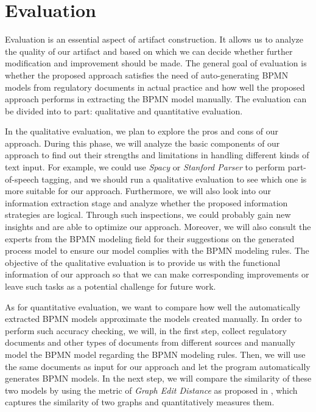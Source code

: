\chapter{Evaluation}

Evaluation is an essential aspect of artifact construction. It allows us to analyze the quality of our artifact and based on which we can decide whether further modification and improvement should be made. The general goal of evaluation is whether the proposed approach satisfies the need of auto-generating BPMN models from regulatory documents in actual practice and how well the proposed approach performs in extracting the BPMN model manually. The evaluation can be divided into to part: qualitative and quantitative evaluation. 

In the qualitative evaluation, we plan to explore the pros and cons of our approach. During this phase, we will analyze the basic components of our approach to find out their strengths and limitations in handling different kinds of text input. For example, we could use \textit{Spacy} or \textit{Stanford Parser} to perform part-of-speech tagging, and we should run a qualitative evaluation to see which one is more suitable for our approach. Furthermore, we will also look into our information extraction stage and analyze whether the proposed information strategies are logical. Through such inspections, we could probably gain new insights and are able to optimize our approach. Moreover, we will also consult the experts from the BPMN modeling field for their suggestions on the generated process model to ensure our model complies with the BPMN modeling rules. The objective of the qualitative evaluation is to provide us with the functional information of our approach so that we can make corresponding improvements or leave such tasks as a potential challenge for future work.

As for quantitative evaluation, we want to compare how well the automatically extracted BPMN models approximate the models created manually. In order to perform such accuracy checking, we will, in the first step, collect regulatory documents and other types of documents from different sources and manually model the BPMN model regarding the BPMN modeling rules. Then, we will use the same documents as input for our approach and let the program automatically generates BPMN models. In the next step, we will compare the similarity of these two models by using the metric of \textit{Graph Edit Distance} as proposed in \cite{t2m_1}, which captures the similarity of two graphs and quantitatively measures them.

